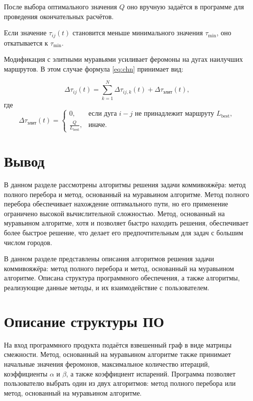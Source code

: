 После выбора оптимального значения $Q$ оно вручную задаётся в программе для проведения окончательных расчётов.

Если значение $\tau_{ij}(t)$ становится меньше минимального значения $\tau_{\text{min}}$, оно откатывается к $\tau_{\text{min}}$.

Модификация с элитными муравьями усиливает феромоны на дугах наилучших маршрутов. В этом случае формула \eqref{eq:chn} принимает вид:

\begin{equation}
\Delta\tau_{ij}(t) = \sum_{k=1}^{N} \Delta\tau_{ij, k}(t) + \Delta\tau_{\text{элит}}(t),
\end{equation}
где 
\begin{equation}
\Delta\tau_{\text{элит}}(t) = 
\begin{cases}
  0, & \text{если дуга $i-j$ не принадлежит маршруту $L_{\text{best}}$}, \\
  \frac{Q}{L_{\text{best}}}, & \text{иначе}.
\end{cases}
\end{equation}


\section*{Вывод}
В данном разделе рассмотрены алгоритмы решения задачи коммивояжёра: метод полного перебора и метод, основанный на муравьином алгоритме. Метод полного перебора обеспечивает нахождение оптимального пути, но его применение ограничено высокой вычислительной сложностью. Метод, основанный на муравьином алгоритме, хотя и позволяет быстро находить решения, обеспечивает более быстрое решение, что делает его предпочтительным для задач с большим числом городов.



В данном разделе представлены описания алгоритмов решения задачи коммивояжёра: метод полного перебора и метод, основанный на муравьином алгоритме. Описана структура программного обеспечения, а также алгоритмы, реализующие данные методы, и их взаимодействие с пользователем.

\section{Описание структуры ПО}

На вход программного продукта подаётся взвешенный граф в виде матрицы смежности. Метод, основанный на муравьином алгоритме также принимает начальные значения феромонов, максимальное количество итераций, коэффициенты $\alpha$ и $\beta$, а также коэффициент испарений. Программа позволяет пользователю выбрать один из двух алгоритмов: метод полного перебора или метод, основанный на муравьином алгоритме.


